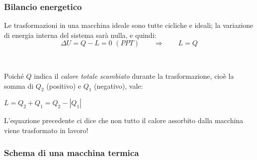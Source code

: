 \documentclass[]{beamer}
\theoremstyle{plain}
\begin{document}
\begin{frame}
  \frametitle{Bilancio energetico}
  Le trasformazioni in una macchina ideale sono tutte cicliche e ideali; la variazione di energia interna del sistema sarà nulla, e quindi:
  \[ \Delta U = Q - L = 0 \,\,(PPT)\qquad\Longrightarrow\qquad L = Q \]\pause

  ~
  
  Poiché $ Q $ indica il \emph{calore totale scambiato} durante la trasformazione, cioè la somma di $ Q_2 $ (positivo) e $ Q_1 $ (negativo), vale:
    \begin{center}
\colorbox{marroncino!30}{$ L = Q_2 + Q_1 = Q_2 - |Q_1| $}
\end{center}\pause
  L'equazione precedente ci dice che \alert{non tutto il calore assorbito dalla macchina viene trasformato in lavoro}!
\end{frame}



\begin{frame}
\frametitle{Schema di una macchina termica}
\begin{figure}
\end{figure}
\end{frame}
\end{document}
